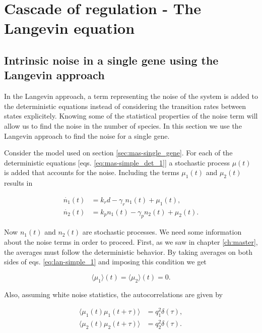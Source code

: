 \chapter{Cascade of regulation - The Langevin equation}

\section{Intrinsic noise in a single gene using the Langevin approach}
\label{sec:lan-single}
In the Langevin approach, a term representing the noise of the system is added to the deterministic equations instead of considering the transition rates between states explicitely. Knowing some of the statistical properties of the noise term will allow us to find the noise in the number of species. In this section we use the Langevin approach to find the noise for a single gene.

Consider the model used on section \ref{sec:mas-single_gene}. For each of the deterministic equations [eqs. \eqref{eq:mas-simple_det_1}] a stochastic process $\mu(t)$ is added that accounts for the noise. Including the terms $\mu_1(t)$ and $\mu_2(t)$ results in

\begin{equation}
  \label{eq:lan-simple_1}
  \begin{split}
    \dot{n_1}(t) &= k_rd-\gamma_rn_1(t) + \mu_1(t),\\
    \dot{n_2}(t) &= k_pn_1(t)-\gamma_pn_2(t) + \mu_2(t).
  \end{split}
\end{equation}

Now $n_1(t)$ and $n_2(t)$ are stochastic processes. We need some information about the noise terms in order to proceed. First, as we saw in chapter \ref{ch:master}, the averages must follow the deterministic behavior. By taking averages on both sides of eqs. \eqref{eq:lan-simple_1} and imposing this condition we get

\begin{equation*}
  \langle\mu_1\rangle(t) = \langle\mu_2\rangle(t) = 0.
\end{equation*}

Also, assuming white noise statistics, the autocorrelations are given by

\begin{align}
  \langle\mu_1(t)\mu_1(t+\tau)\rangle &= q_1^2\delta(\tau),\label{eq:lan-simple_cor1} \\
  \langle\mu_2(t)\mu_2(t+\tau)\rangle &= q_2^2\delta(\tau). \label{eq:lan-simple_cor2}
\end{align}

